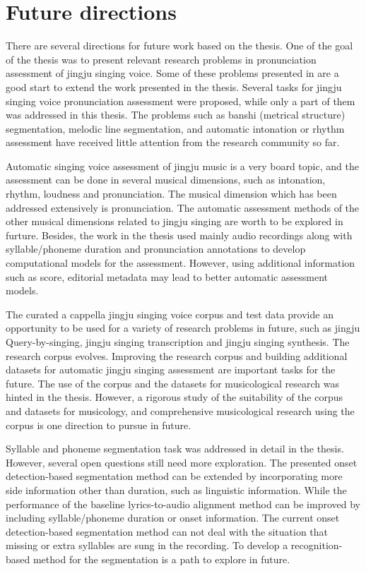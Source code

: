 \section{Future directions}

There are several directions for future work based on the thesis. One of the goal of the thesis was to present relevant research problems in pronunciation assessment of jingju singing voice. Some of these problems presented in  are a good start to extend the work presented in the thesis. Several tasks for jingju singing voice pronunciation assessment were proposed, while only a part of them was addressed in this thesis. The problems such as banshi (metrical structure) segmentation, melodic line segmentation, and automatic intonation or rhythm assessment have received little attention from the research community so far.

Automatic singing voice assessment of jingju music is a very board topic, and the assessment can be done in several musical dimensions, such as intonation, rhythm, loudness and pronunciation. The musical dimension which has been addressed extensively is pronunciation. The automatic assessment methods of the other musical dimensions related to jingju singing are worth to be explored in furture. Besides, the work in the thesis used mainly audio recordings along with syllable/phoneme duration and pronunciation annotations to develop computational models for the assessment. However, using additional information such as score, editorial metadata may lead to better automatic assessment models.

The curated a cappella jingju singing voice corpus and test data provide an opportunity to be used for a variety of research problems in future, such as jingju Query-by-singing, jingju singing transcription and jingju singing synthesis. The research corpus evolves. Improving the research corpus and building additional datasets for automatic jingju singing assessment are important tasks for the future. The use of the corpus and the datasets for musicological research was hinted in the thesis. However, a rigorous study of the suitability of the corpus and datasets for musicology, and comprehensive musicological research using the corpus is one direction to pursue in future.

Syllable and phoneme segmentation task was addressed in detail in the thesis. However, several open questions still need more exploration. The presented onset detection-based segmentation method can be extended by incorporating more side information other than duration, such as linguistic information. While the performance of the baseline lyrics-to-audio alignment method can be improved by including syllable/phoneme duration or onset information. The current onset detection-based segmentation method can not deal with the situation that missing or extra syllables are sung in the recording. To develop a recognition-based method for the segmentation is a path to explore in future.

